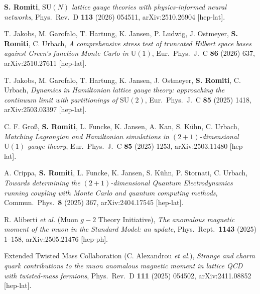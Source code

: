 \begin{enumerate}[leftmargin=1.6em,labelsep=0.5em,label={[J\arabic*]},itemsep=2pt,topsep=3pt]
  \item \label{pub:pinn} \textbf{S. Romiti}, \textit{$\mathrm{SU}(N)$ lattice gauge theories with physics-informed neural
  networks}, Phys.\ Rev.\ D \textbf{113} (2026) 054511, arXiv:2510.26904 [hep-lat].

  \item T. Jakobs, M. Garofalo, T. Hartung, K. Jansen, P. Ludwig, J. Ostmeyer, \textbf{S. Romiti}, C. Urbach,
  \textit{A comprehensive stress test of truncated Hilbert space bases against Green's function Monte Carlo in
  $\mathrm{U}(1)$}, Eur.\ Phys.\ J.\ C \textbf{86} (2026) 637, arXiv:2510.27611 [hep-lat].

  \item T. Jakobs, M. Garofalo, T. Hartung, K. Jansen, J. Ostmeyer, \textbf{S. Romiti}, C. Urbach,
  \textit{Dynamics in Hamiltonian lattice gauge theory: approaching the continuum limit with partitionings of
  $\mathrm{SU}(2)$}, Eur.\ Phys.\ J.\ C \textbf{85} (2025) 1418, arXiv:2503.03397 [hep-lat].

  \item \label{pub:matching} C. F. Gro\ss{}, \textbf{S. Romiti}, L. Funcke, K. Jansen, A. Kan, S. K\"uhn, C. Urbach,
  \textit{Matching Lagrangian and Hamiltonian simulations in $(2+1)$-dimensional $\mathrm{U}(1)$ gauge theory},
  Eur.\ Phys.\ J.\ C \textbf{85} (2025) 1253, arXiv:2503.11480 [hep-lat].

  \item \label{pub:runningcoupling} A. Crippa, \textbf{S. Romiti}, L. Funcke, K. Jansen, S. K\"uhn, P. Stornati, C. Urbach,
  \textit{Towards determining the $(2+1)$-dimensional Quantum Electrodynamics running coupling with Monte Carlo
  and quantum computing methods}, Commun.\ Phys.\ \textbf{8} (2025) 367, arXiv:2404.17545 [hep-lat].

  \item R. Aliberti \textit{et al.} (Muon $g-2$ Theory Initiative), \textit{The anomalous magnetic moment of the
  muon in the Standard Model: an update}, Phys.\ Rept.\ \textbf{1143} (2025) 1--158, arXiv:2505.21476 [hep-ph].

  \item \label{pub:g2etm} Extended Twisted Mass Collaboration (C. Alexandrou \textit{et al.}), \textit{Strange and charm quark
  contributions to the muon anomalous magnetic moment in lattice QCD with twisted-mass fermions}, Phys.\ Rev.\ D
  \textbf{111} (2025) 054502, arXiv:2411.08852 [hep-lat].


\end{enumerate}

